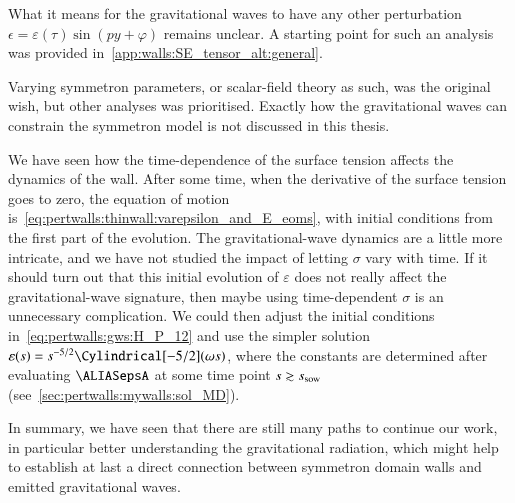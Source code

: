 








What it means for the gravitational waves to have any other perturbation $\epsilon= \varepsilon(\tau) \sin{(py + \varphi)}$ remains unclear. A starting point for such an analysis was provided in~\cref{app:walls:SE_tensor_alt:general}. 

Varying symmetron parameters, or scalar-field theory as such, was the original wish, but other analyses was prioritised. Exactly how the gravitational waves can constrain the symmetron model is not discussed in this thesis.

We have seen how the time-dependence of the surface tension affects the dynamics of the wall. %
After some time, when the derivative of the surface tension goes to zero, the equation of motion is~\cref{eq:pertwalls:thinwall:varepsilon_and_E_eoms}, with initial conditions from the first part of the evolution. The gravitational-wave dynamics are a little more intricate, and we have not studied the impact of letting $\sigma$ vary with time. If it should turn out that this initial evolution of $\varepsilon$ does not really affect the gravitational-wave signature, then maybe using time-dependent $\sigma$ is an unnecessary complication. We could then adjust the initial conditions in~\cref{eq:pertwalls:gws:H_P_12} and use the simpler solution $\varepsilon(s)= {s}^{-5/2} \Cylindrical[-5/2](\omega s)$, where the constants are determined after evaluating $\epsA$ at some time point $s\gtrsim s_\mathrm{sow}$ (see~\cref{sec:pertwalls:mywalls:sol_MD}).


In summary, we have seen that there are still many paths to continue our work, in particular better understanding the gravitational radiation, which might help to establish at last a direct connection between symmetron domain walls and emitted gravitational waves.















